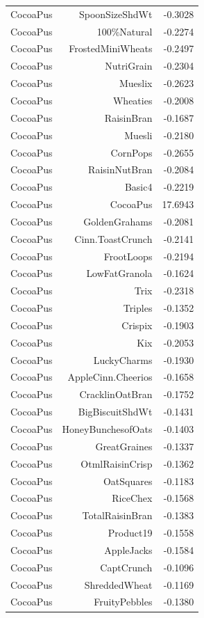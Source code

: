\begin{longtable}{@{}lrr@{}}
CocoaPus & SpoonSizeShdWt & -0.3028 \\
CocoaPus & 100\%Natural & -0.2274 \\
CocoaPus & FrostedMiniWheats & -0.2497 \\
CocoaPus & NutriGrain & -0.2304 \\
CocoaPus & Mueslix & -0.2623 \\
CocoaPus & Wheaties & -0.2008 \\
CocoaPus & RaisinBran & -0.1687 \\
CocoaPus & Muesli & -0.2180 \\
CocoaPus & CornPops & -0.2655 \\
CocoaPus & RaisinNutBran & -0.2084 \\
CocoaPus & Basic4 & -0.2219 \\
CocoaPus & CocoaPus & 17.6943 \\
CocoaPus & GoldenGrahams & -0.2081 \\
CocoaPus & Cinn.ToastCrunch & -0.2141 \\
CocoaPus & FrootLoops & -0.2194 \\
CocoaPus & LowFatGranola & -0.1624 \\
CocoaPus & Trix & -0.2318 \\
CocoaPus & Triples & -0.1352 \\
CocoaPus & Crispix & -0.1903 \\
CocoaPus & Kix & -0.2053 \\
CocoaPus & LuckyCharms & -0.1930 \\
CocoaPus & AppleCinn.Cheerios & -0.1658 \\
CocoaPus & CracklinOatBran & -0.1752 \\
CocoaPus & BigBiscuitShdWt & -0.1431 \\
CocoaPus & HoneyBunchesofOats & -0.1403 \\
CocoaPus & GreatGraines & -0.1337 \\
CocoaPus & OtmlRaisinCrisp & -0.1362 \\
CocoaPus & OatSquares & -0.1183 \\
CocoaPus & RiceChex & -0.1568 \\
CocoaPus & TotalRaisinBran & -0.1383 \\
CocoaPus & Product19 & -0.1558 \\
CocoaPus & AppleJacks & -0.1584 \\
CocoaPus & CaptCrunch & -0.1096 \\
CocoaPus & ShreddedWheat & -0.1169 \\
CocoaPus & FruityPebbles & -0.1380 \\

\end{longtable}
